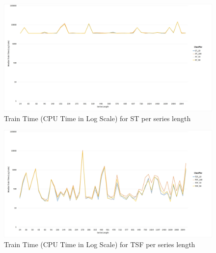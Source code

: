   \begin{figure} [!htb]
    \centering
    \includegraphics[width=\textwidth]{./Chapters/06 Results/Duration_st_length.jpg}
    \caption{Train Time (CPU Time in Log Scale) for ST per series length}
  \end{figure}
  
  \begin{figure} [!htb]
    \centering
    \includegraphics[width=\textwidth]{./Chapters/06 Results/Duration_tsf_length.jpg}
    \caption{Train Time (CPU Time in Log Scale) for TSF per series length}
  \end{figure}

